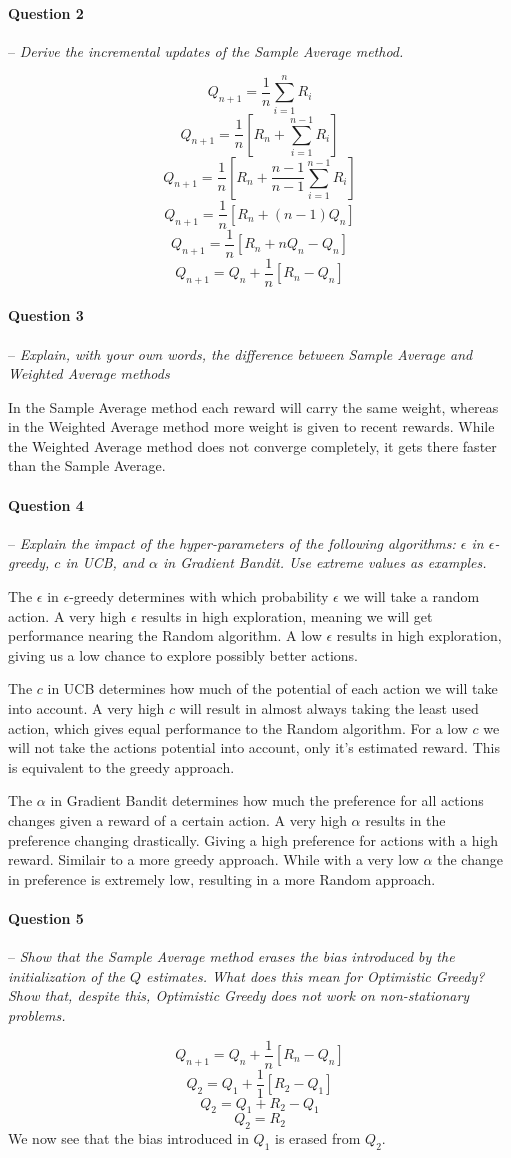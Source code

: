 \documentclass[a4paper]{article}
\newcommand{\question}[2]{
\paragraph{Question #1} -- \textit{#2}

}
\begin{document}
\question{2}{Derive the incremental updates of the Sample Average method.}
\[Q_{n+1} = \frac{1}{n}\sum_{i=1}^{n}R_i \]
\[Q_{n+1} = \frac{1}{n}[R_n + \sum_{i=1}^{n-1}R_i] \]
\[Q_{n+1} = \frac{1}{n}[R_n + \frac{n-1}{n-1}\sum_{i=1}^{n-1}R_i] \]
\[Q_{n+1} = \frac{1}{n}[R_n + (n-1)Q_n] \]
\[Q_{n+1} = \frac{1}{n}[R_n + nQ_n - Q_n] \]
\[Q_{n+1} = Q_n + \frac{1}{n}[R_n - Q_n] \]


\question{3}{Explain, with your own words, the difference between Sample Average and Weighted Average methods}
In the Sample Average method each reward will carry the same weight, whereas in the Weighted Average method more weight is given to recent rewards.
While the Weighted Average method does not converge completely, it gets there faster than the Sample Average.

\question{4}{Explain the impact of the hyper-parameters of the following algorithms: $\epsilon$ in $\epsilon$-greedy, $c$ in UCB, and $\alpha$ in Gradient Bandit. Use extreme values as examples.}
The $\epsilon$ in $\epsilon$-greedy determines with which probability $\epsilon$ we will take a random action.
A very high $\epsilon$ results in high exploration, meaning we will get performance nearing the Random algorithm.
A low $\epsilon$ results in high exploration, giving us a low chance to explore possibly better actions.


The $c$ in UCB determines how much of the potential of each action we will take into account.
A very high $c$ will result in almost always taking the least used action, which gives equal performance to the Random algorithm.
For a low $c$ we will not take the actions potential into account, only it's estimated reward. This is equivalent to the greedy approach.

The $\alpha$ in Gradient Bandit determines how much the preference for all actions changes given a reward of a certain action.
A very high $\alpha$ results in the preference changing drastically. Giving a high preference for actions with a high reward. Similair to a more greedy approach.
While with a very low $\alpha$ the change in preference is extremely low, resulting in a more Random approach.

\question{5}{Show that the Sample Average method erases the bias introduced by the initialization of the $Q$ estimates. What does this mean for Optimistic Greedy? Show that, despite this, Optimistic Greedy does not work on non-stationary problems.}
\[Q_{n+1} = Q_n + \frac{1}{n}[R_n - Q_n] \]
\[Q_{2} = Q_1 + \frac{1}{1}[R_2 - Q_1] \]
\[Q_{2} = Q_1 + R_2 - Q_1\]
\[Q_{2} = R_2\]
We now see that the bias introduced in $Q_1$ is erased from $Q_2$.
\end{document}
